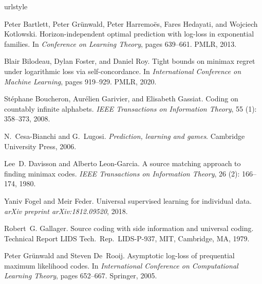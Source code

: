\documentclass[12pt]{colt2021} %
\theoremstyle{remark}
\begin{document}
\begin{thebibliography}{32}
\providecommand{\natexlab}[1]{#1}
\providecommand{\url}[1]{\texttt{#1}}
\expandafter\ifx\csname urlstyle\endcsname\relax
  \providecommand{\doi}[1]{doi: #1}\else
  \providecommand{\doi}{doi: \begingroup \urlstyle{rm}\Url}\fi

Peter Bartlett, Peter Gr{\"u}nwald, Peter Harremo{\"e}s, Fares Hedayati, and
  Wojciech Kotlowski.
\newblock Horizon-independent optimal prediction with log-loss in exponential
  families.
\newblock In \emph{Conference on Learning Theory}, pages 639--661. PMLR, 2013.

Blair Bilodeau, Dylan Foster, and Daniel Roy.
\newblock Tight bounds on minimax regret under logarithmic loss via
  self-concordance.
\newblock In \emph{International Conference on Machine Learning}, pages
  919--929. PMLR, 2020.

St{\'e}phane Boucheron, Aur{\'e}lien Garivier, and Elisabeth Gassiat.
\newblock Coding on countably infinite alphabets.
\newblock \emph{IEEE Transactions on Information Theory}, 55
  (1): 358--373, 2008.

N.~Cesa-Bianchi and G.~Lugosi.
\newblock \emph{Prediction, learning and games}.
\newblock Cambridge University Press, 2006.

Lee~D. Davisson and Alberto Leon-Garcia.
\newblock A source matching approach to finding minimax codes.
\newblock \emph{IEEE Transactions on Information Theory}, 26
  (2): 166--174, 1980.

Yaniv Fogel and Meir Feder.
\newblock Universal supervised learning for individual data.
\newblock \emph{arXiv preprint arXiv:1812.09520}, 2018.

Robert~G. Gallager.
\newblock Source coding with side information and universal coding.
\newblock Technical Report LIDS Tech.\ Rep.\ LIDS-P-937, MIT, Cambridge, MA,
  1979.

Peter Gr{\"u}nwald and Steven De~Rooij.
\newblock Asymptotic log-loss of prequential maximum likelihood codes.
\newblock In \emph{International Conference on Computational Learning Theory},
  pages 652--667. Springer, 2005.


\end{thebibliography}
\end{document}
